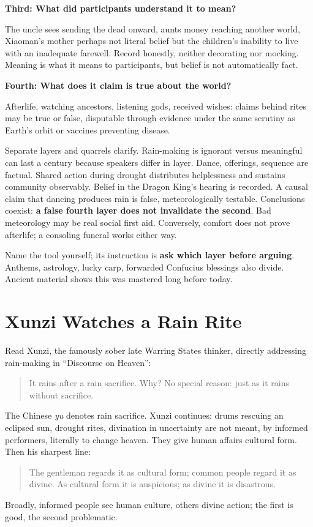 \textbf{Third: What did participants understand it to mean?}

The uncle sees sending the dead onward, aunts money reaching another world, Xiaoman's mother perhaps not literal belief but the children's inability to live with an inadequate farewell. Record honestly, neither decorating nor mocking. Meaning is what it means to participants, but belief is not automatically fact.

\textbf{Fourth: What does it claim is true about the world?}

Afterlife, watching ancestors, listening gods, received wishes: claims behind rites may be true or false, disputable through evidence under the same scrutiny as Earth's orbit or vaccines preventing disease.

Separate layers and quarrels clarify. Rain-making is ignorant versus meaningful can last a century because speakers differ in layer. Dance, offerings, sequence are factual. Shared action during drought distributes helplessness and sustains community observably. Belief in the Dragon King's hearing is recorded. A causal claim that dancing produces rain is false, meteorologically testable. Conclusions coexist: \textbf{a false fourth layer does not invalidate the second}. Bad meteorology may be real social first aid. Conversely, comfort does not prove afterlife; a consoling funeral works either way.

Name the tool yourself; its instruction is \textbf{ask which layer before arguing}. Anthems, astrology, lucky carp, forwarded Confucius blessings also divide. Ancient material shows this was mastered long before today.

\section{Xunzi Watches a Rain Rite}
Read Xunzi, the famously sober late Warring States thinker, directly addressing rain-making in ``Discourse on Heaven'':

\begin{quote}
It rains after a rain sacrifice. Why? No special reason: just as it rains without sacrifice.
\end{quote}
The Chinese \textit{yu} denotes rain sacrifice. Xunzi continues: drums rescuing an eclipsed sun, drought rites, divination in uncertainty are not meant, by informed performers, literally to change heaven. They give human affairs cultural form. Then his sharpest line:

\begin{quote}
The gentleman regards it as cultural form; common people regard it as divine. As cultural form it is auspicious; as divine it is disastrous.
\end{quote}
Broadly, informed people see human culture, others divine action; the first is good, the second problematic.

